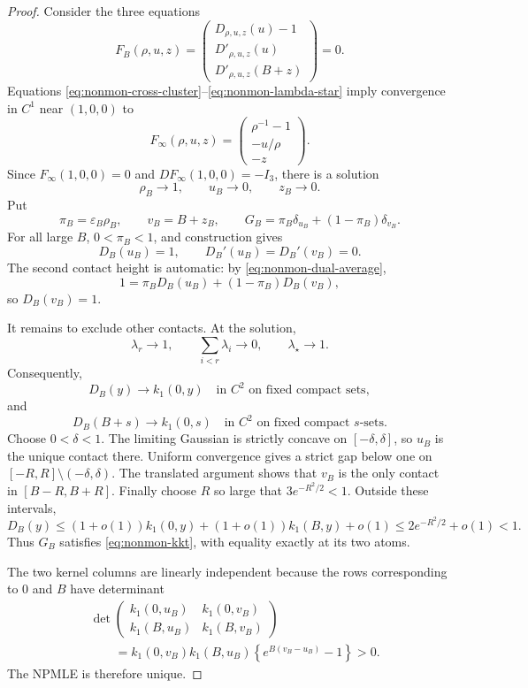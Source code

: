 \begin{proof}
Consider the three equations
\[
    F_B(\rho,u,z)
    =
    \begin{pmatrix}
        D_{\rho,u,z}(u)-1\\
        D'_{\rho,u,z}(u)\\
        D'_{\rho,u,z}(B+z)
    \end{pmatrix}
    =0.
\]
Equations
\eqref{eq:nonmon-cross-cluster}--\eqref{eq:nonmon-lambda-star} imply
convergence in \(C^1\) near \((1,0,0)\) to
\[
    F_\infty(\rho,u,z)
    =
    \begin{pmatrix}
        \rho^{-1}-1\\
        -u/\rho\\
        -z
    \end{pmatrix}.
\]
Since \(F_\infty(1,0,0)=0\) and
\(DF_\infty(1,0,0)=-I_3\), there is a solution
\[
    \rho_B\to1,\qquad u_B\to0,\qquad z_B\to0.
\]
Put
\[
    \pi_B=\varepsilon_B\rho_B,
    \qquad
    v_B=B+z_B,
    \qquad
    G_B=\pi_B\delta_{u_B}+(1-\pi_B)\delta_{v_B}.
\]
For all large \(B\), \(0<\pi_B<1\), and construction gives
\[
    D_B(u_B)=1,\qquad D_B'(u_B)=D_B'(v_B)=0.
\]
The second contact height is automatic: by
\eqref{eq:nonmon-dual-average},
\[
    1=\pi_BD_B(u_B)+(1-\pi_B)D_B(v_B),
\]
so \(D_B(v_B)=1\).

It remains to exclude other contacts. At the solution,
\[
    \lambda_r\to1,\qquad
    \sum_{i<r}\lambda_i\to0,\qquad
    \lambda_\star\to1.
\]
Consequently,
\[
    D_B(y)\to k_1(0,y)
    \quad\text{in \(C^2\) on fixed compact sets},
\]
and
\[
    D_B(B+s)\to k_1(0,s)
    \quad\text{in \(C^2\) on fixed compact \(s\)-sets}.
\]
Choose \(0<\delta<1\). The limiting Gaussian is strictly concave on
\([-\delta,\delta]\), so \(u_B\) is the unique contact there. Uniform
convergence gives a strict gap below one on
\([-R,R]\setminus(-\delta,\delta)\). The translated argument shows that
\(v_B\) is the only contact in \([B-R,B+R]\). Finally choose \(R\) so large
that \(3e^{-R^2/2}<1\). Outside these intervals,
\[
    D_B(y)
    \le
    (1+o(1))k_1(0,y)
    +(1+o(1))k_1(B,y)+o(1)
    \le2e^{-R^2/2}+o(1)<1.
\]
Thus \(G_B\) satisfies \eqref{eq:nonmon-kkt}, with equality exactly at its
two atoms.

The two kernel columns are linearly independent because the rows
corresponding to \(0\) and \(B\) have determinant
\[
\begin{aligned}
    &\det
    \begin{pmatrix}
        k_1(0,u_B)&k_1(0,v_B)\\
        k_1(B,u_B)&k_1(B,v_B)
    \end{pmatrix}\\
    &\qquad
    =
    k_1(0,v_B)k_1(B,u_B)
    \left\{e^{B(v_B-u_B)}-1\right\}>0.
\end{aligned}
\]
The NPMLE is therefore unique.
\end{proof}

